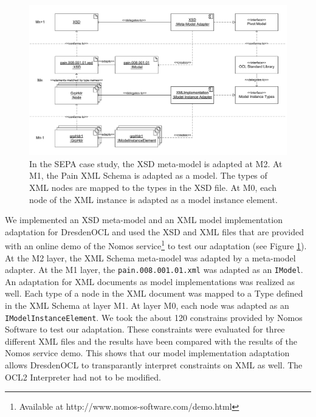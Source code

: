 \begin{figure}[tb]
	\centering
		\includegraphics[width=1.00\textwidth]{figures/casestudy02.pdf}
	\caption{In the SEPA case study, the XSD meta-model is adapted at M2. At M1, the Pain XML Schema is adapted as a model. The types of XML nodes are mapped to the types in the XSD file. At M0, each node of the XML instance is adapted as a model instance element.}
	\label{fig:casestudy02}
\end{figure}

We implemented an XSD meta-model and an XML model implementation adaptation 
for DresdenOCL and used the  XSD and XML files that are 
provided with an online demo of the Nomos service\footnote{Available at http://www.nomos-software.com/demo.html} 
to test our adaptation (see Figure \ref{fig:casestudy02}). At the M2 layer, 
the XML Schema meta-model was adapted by a meta-model adapter. At the M1 layer, 
the \texttt{pain.008.001.01.xml} was adapted as an \texttt{IModel}. An 
adaptation for XML documents as model implementations was realized as well. 
Each type of a node in the XML document was mapped to a Type defined in the 
XML Schema at layer M1. At layer M0, each node was adapted as an 
\texttt{IModelInstanceElement}. We took the  about 120 constrains
provided by Nomos Software to test our adaptation. These constraints were
evaluated for three different XML files and the results have been
 compared with the results of the Nomos service demo. This shows that our model
implementation adaptation allows DresdenOCL to transparantly interpret
constraints on XML as well. The OCL2 Interpreter had not to be
modified.


